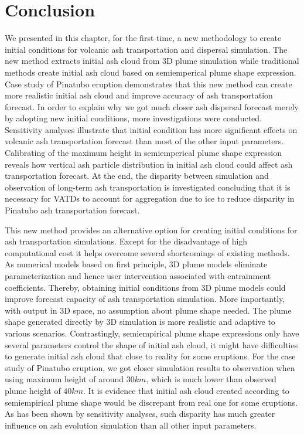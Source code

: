 \section*{Conclusion}

We presented in this chapter, for the first time, a new methodology to create initial conditions for volcanic ash transportation and dispersal simulation. The new method extracts initial ash cloud from 3D plume simulation while traditional methods create initial ash cloud based on semiemperical plume shape expression. Case study of Pinatubo eruption demonstrates that this new method can create more realistic initial ash cloud and improve accuracy of ash transportation forecast. In order to explain why we got much closer ash dispersal forecast merely by adopting new initial conditions, more investigations were conducted. Sensitivity analyses illustrate that initial condition has more significant effects on volcanic ash transportation forecast than most of the other input parameters. Calibrating of the maximum height in semiemperical plume shape expression reveals how vertical ash particle distribution in initial ash cloud could affect ash transportation forecast. At the end, the disparity between simulation and observation of long-term ash transportation is investigated concluding that it is necessary for VATDs to account for aggregation due to ice to reduce disparity in Pinatubo ash transportation forecast.

This new method provides an alternative option for creating initial conditions for ash transportation simulations. Except for the disadvantage of high computational cost it helps overcome several shortcomings of existing methods.
As numerical models based on first principle, 3D plume models eliminate parameterization and hence user intervention associated with entrainment coefficients. Thereby, obtaining initial conditions from 3D plume models could improve forecast capacity of ash transportation simulation. More importantly, with output in 3D space, no assumption about plume shape needed. The plume shape generated directly by 3D simulation is more realistic and adaptive to various scenarios.
Contrastingly, semiempirical plume shape expressions only have several parameters control the shape of initial ash cloud, it might have difficulties to generate initial ash cloud that close to reality for some eruptions.
For the case study of Pinatubo eruption, we got closer simulation results to observation when using maximum height of around $30 km$, which is much lower than observed plume height of $40 km$. It is evidence that initial ash cloud created according to semiempirical plume shape would be discrepant from real one for some eruptions. As has been shown by sensitivity analyses, such disparity has much greater influence on ash evolution simulation than all other input parameters.

